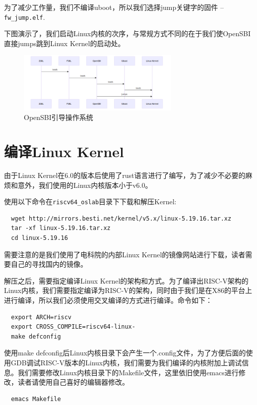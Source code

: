 \documentclass[lang=cn,10pt]{elegantbook}
\begin{document}
为了减少工作量，我们不编译uboot，所以我们选择jump关键字的固件 -- \lstinline{fw_jump.elf}.

下图演示了，我们启动Linux内核的次序，与常规方式不同的在于我们使OpenSBI直接jumps跳到Linux Kernel的启动处。

\begin{figure}[htbp]
  \centering
  \includegraphics[width=0.7\textwidth]{image/uboot.png}
  \caption{OpenSBI引导操作系统}
\end{figure}


\section{编译Linux Kernel}
由于Linux Kernel在6.0的版本后使用了rust语言进行了编写，为了减少不必要的麻烦和意外，我们使用的Linux内核版本小于v6.0。

使用以下命令在\lstinline{riscv64_oslab}目录下下载和解压Kernel:

\begin{lstlisting}
  wget http://mirrors.besti.net/kernel/v5.x/linux-5.19.16.tar.xz
  tar -xf linux-5.19.16.tar.xz
  cd linux-5.19.16  
\end{lstlisting}

需要注意的是我们使用了电科院的内部Linux Kernel的镜像网站进行下载，读者需要自己的寻找国内的镜像。

解压之后，需要指定编译Linux Kernel的架构和方式。为了编译出RISC-V架构的Linux内核，我们需要指定编译为RISC-V的架构，同时由于我们是在X86的平台上进行编译，所以我们必须使用交叉编译的方式进行编译。命令如下：

\begin{lstlisting}
  export ARCH=riscv
  export CROSS_COMPILE=riscv64-linux-
  make defconfig  
\end{lstlisting}

使用make defconfig后Linux内核目录下会产生一个.config文件，为了方便后面的使用GDB调试RISC-V版本的Linux内核，我们需要为我们编译的内核附加上调试信息。我们需要修改Linux内核目录下的Makefile文件，这里依旧使用emacs进行修改，读者请使用自己喜好的编辑器修改。

\begin{lstlisting}
  emacs Makefile
\end{lstlisting}
\end{document}
